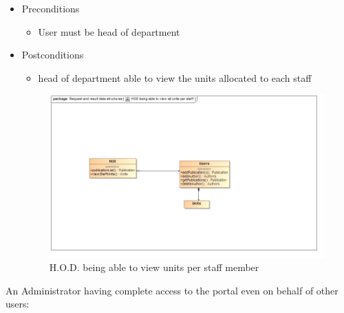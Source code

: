 \documentclass[a4paper,12pt]{article}
\begin{document}
\begin{itemize}
    \item Preconditions
    \begin{itemize}
        \item User must be head of department
    \end{itemize}
    \item Postconditions
    \begin{itemize}
        \item head of department able to view the units allocated to each staff
    \end{itemize}
    
    \begin{figure}[H]
    \centering
    \caption{H.O.D. being able to view units per staff member}
    \includegraphics[width=1\textwidth]{use-case/hod-viewing-units.png}
    \end{figure}
\end{itemize}
An Administrator having complete access to the portal even on behalf of other users:
\end{document}
